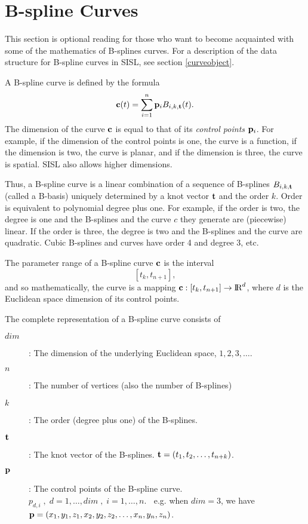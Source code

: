 \section{B-spline Curves}

This section is optional reading for those who want to
become acquainted with some of the mathematics of
B-splines curves. For a description of the data structure for
B-spline curves in SISL, see section \ref{curveobject}.

A B-spline curve is defined by the formula
$$ {\bf c}(t) = \sum_{i=1}^{n} {\bf p}_{i} B_{i,k,{\bf t}}(t). $$
The dimension of the curve ${\bf c}$ is equal to that of its
{\it control points} ${\bf p}_i$. For example, if the dimension of the
control points
is one, the curve is a function, if the dimension is two,
the curve is planar, and if the dimension is three,
the curve is spatial. SISL also allows higher dimensions.

Thus, a B-spline curve is a linear combination of a sequence of B-splines
$B_{i,k,{\bf t}}$ (called a B-basis)
uniquely determined by a knot vector ${\bf t}$ and
the order $k$. Order is equivalent to polynomial degree plus one.
For example, if the order is two, the degree is one and the B-splines
and the curve $c$ they generate are (piecewise) linear.
If the order is three, the degree is two and the B-splines and
the curve are quadratic. Cubic B-splines and
curves have order 4 and degree 3, etc.

The parameter range of a B-spline curve ${\bf c}$ is the interval
$$ [t_k, t_{n+1}], $$
and so mathematically, the curve is a mapping
${\bf c}: [t_k, t_{n+1}] \to \hbox{\rm I\negthinspace R}^d$, where $d$ is the Euclidean space
dimension of its control points.

The complete representation of a B-spline curve consists of
\begin{description}
\item[$dim$]: The dimension of the underlying Euclidean space,
              $1,2,3,\ldots$.
\item[$n$]: The number of vertices (also the number of B-splines)
\item[$k$]: The order (degree plus one) of the B-splines.
\item[${\bf t}$]: The knot vector of the B-splines.
            ${\bf t} = (t_1, t_2, \ldots, t_{n+k})$.
\item[${\bf p}$]: The control points of the B-spline curve.
           $p_{d,i}\;,\; d=1,\ldots,dim\;,\;
                i=1,\ldots,n.\;\;$
                e.g. when $dim = 3$, we have
                ${\bf p} = (x_1,y_1,z_1,x_2,y_2,z_2,\ldots,x_n,y_n,z_n)$.
\end{description}

